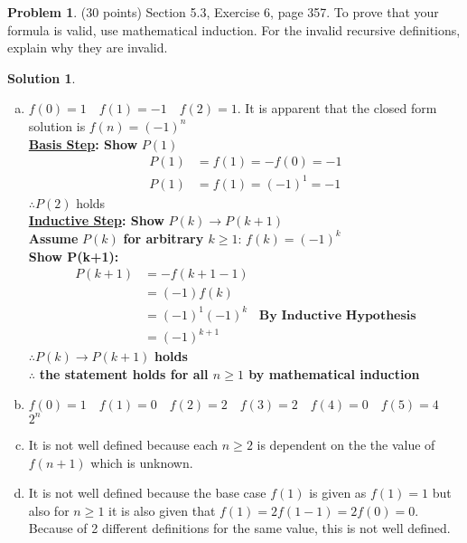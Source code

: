 \documentclass{article}
\theoremstyle{definition}
\newtheorem{problem}{Problem}
\newtheorem*{solution}{Solution}
\begin{document}
\begin{problem} (30 points)
Section 5.3, Exercise 6, page 357.
To prove that your formula is valid, use mathematical induction.
For the invalid recursive definitions, explain why they are invalid.
\end{problem}
\begin{solution} \ \\
\begin{enumerate}[a)]
  \item $f(0) = 1 \quad f(1) = -1 \quad f(2) = 1$. It is apparent that the closed form solution is $f(n) = (-1)^n$ \\
  \textbf{\underline{Basis Step}: Show }$P(1)$ \\
  \begin{align*}
  P(1) &= f(1) = -f(0) = -1 \\
  P(1) &= f(1) = (-1)^1 = -1
  \end{align*}
  $\therefore P(2)$ holds \\
  \textbf{\underline{Inductive Step}: Show } $P(k) \rightarrow P(k+1)$ \\
  \textbf{Assume} $P(k)$ \textbf{for arbitrary $k \ge  1$}: $f(k) = (-1)^k$ \\
  \textbf{Show P(k+1):}
  \begin{align*}
    P(k+1) &= -f(k+1-1) \\
    &= (-1) f(k) \\
    &= (-1)^1 (-1)^k &\textbf{By Inductive Hypothesis}\\
    &= (-1)^{k+1}
  \end{align*}
  $\therefore P(k) \rightarrow P(k+1)$ \textbf{holds}\\
  $\therefore$ \textbf{the statement holds for all $n \ge 1 $ by mathematical induction}
  
  \item $f(0) = 1 \quad f(1) = 0 \quad f(2) = 2 \quad f(3) = 2 \quad f(4) = 0 \quad f(5) = 4$ \\
  $2^n $
  
  \item It is not well defined because each $n \ge 2$ is dependent on the the value of $f(n+1)$ which is unknown.
  
  \item It is not well defined because the base case $f(1)$ is given as $f(1) = 1$ but also for $n \ge 1$ it is also given that $f(1) = 2f(1-1) = 2f(0) = 0$. Because of 2 different definitions for the same value, this is not well defined.
  

\end{enumerate}
\end{solution}
\end{document}
